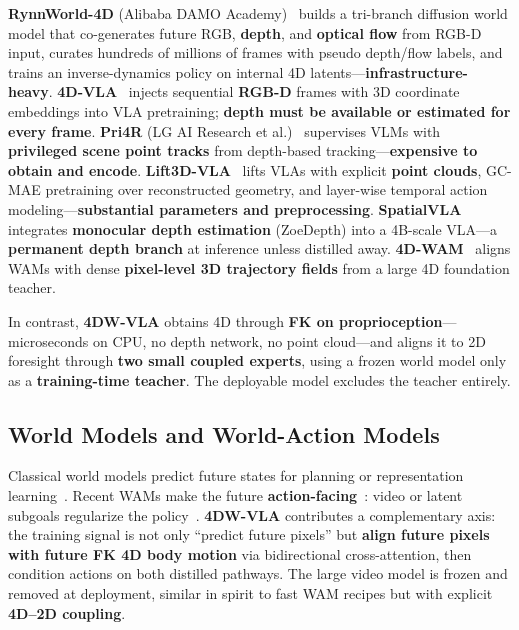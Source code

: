 \textbf{RynnWorld-4D} (Alibaba DAMO Academy)~\cite{rynnworld4d2026} builds a tri-branch diffusion world model that co-generates future RGB, \textbf{depth}, and \textbf{optical flow} from RGB-D input, curates hundreds of millions of frames with pseudo depth/flow labels, and trains an inverse-dynamics policy on internal 4D latents---\textbf{infrastructure-heavy}. \textbf{4D-VLA}~\cite{fourdvla2025} injects sequential \textbf{RGB-D} frames with 3D coordinate embeddings into VLA pretraining; \textbf{depth must be available or estimated for every frame}. \textbf{Pri4R} (LG AI Research et al.)~\cite{pri4r2026} supervises VLMs with \textbf{privileged scene point tracks} from depth-based tracking---\textbf{expensive to obtain and encode}. \textbf{Lift3D-VLA}~\cite{lift3dvla2026} lifts VLAs with explicit \textbf{point clouds}, GC-MAE pretraining over reconstructed geometry, and layer-wise temporal action modeling---\textbf{substantial parameters and preprocessing}. \textbf{SpatialVLA}~\cite{spatialvla2025} integrates \textbf{monocular depth estimation} (ZoeDepth) into a 4B-scale VLA---a \textbf{permanent depth branch} at inference unless distilled away. \textbf{4D-WAM}~\cite{fourdwam2026} aligns WAMs with dense \textbf{pixel-level 3D trajectory fields} from a large 4D foundation teacher.

In contrast, \textbf{4DW-VLA} obtains 4D through \textbf{FK on proprioception}---microseconds on CPU, no depth network, no point cloud---and aligns it to 2D foresight through \textbf{two small coupled experts}, using a frozen world model only as a \textbf{training-time teacher}. The deployable model excludes the teacher entirely.

\subsection{World Models and World-Action Models}

Classical world models predict future states for planning or representation learning~\cite{ha2018worldmodels,levy2026simdist,hansen2024tdmpc2}. Recent WAMs make the future \textbf{action-facing}~\cite{nvidia2026wam,wamsurvey2026}: video or latent subgoals regularize the policy~\cite{lawam2026,dreaming2026}. \textbf{4DW-VLA} contributes a complementary axis: the training signal is not only ``predict future pixels'' but \textbf{align future pixels with future FK 4D body motion} via bidirectional cross-attention, then condition actions on both distilled pathways. The large video model is frozen and removed at deployment, similar in spirit to fast WAM recipes but with explicit \textbf{4D--2D coupling}.

